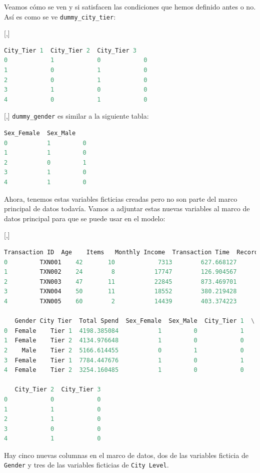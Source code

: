 Veamos cómo se ven y si satisfacen las condiciones que hemos definido
antes o no. Así es como se ve \texttt{dummy\_city\_tier}:

[,]{}
\begin{lstlisting}[language=Python]
   City_Tier 1  City_Tier 2  City_Tier 3
0            1            0            0
1            0            1            0
2            0            1            0
3            1            0            0
4            0            1            0
\end{lstlisting}

[,]{}
\texttt{dummy\_gender} es similar a la siguiente tabla:
\begin{lstlisting}[language=Python]
   Sex_Female  Sex_Male
0           1         0
1           1         0
2           0         1
3           1         0
4           1         0
\end{lstlisting}


Ahora, tenemos estas variables ficticias creadas pero no son parte del
marco principal de datos todavía. Vamos a adjuntar estas nuevas variables al marco de datos principal para que
se puede usar en el modelo:

[,]{}

\begin{lstlisting}[language=Python]
  Transaction ID  Age    Items   Monthly Income  Transaction Time  Record  \
0         TXN001    42       10            7313        627.668127       5
1         TXN002    24        8           17747        126.904567       3
2         TXN003    47       11           22845        873.469701       2
3         TXN004    50       11           18552        380.219428       7
4         TXN005    60        2           14439        403.374223       2

   Gender City Tier  Total Spend  Sex_Female  Sex_Male  City_Tier 1  \
0  Female    Tier 1  4198.385084           1         0            1
1  Female    Tier 2  4134.976648           1         0            0
2    Male    Tier 2  5166.614455           0         1            0
3  Female    Tier 1  7784.447676           1         0            1
4  Female    Tier 2  3254.160485           1         0            0

   City_Tier 2  City_Tier 3
0            0            0
1            1            0
2            1            0
3            0            0
4            1            0
\end{lstlisting}


Hay cinco nuevas columnas en el marco de datos, dos de las variables ficticia de \texttt{Gender} y tres de las variables ficticias de \texttt{City Level}.


